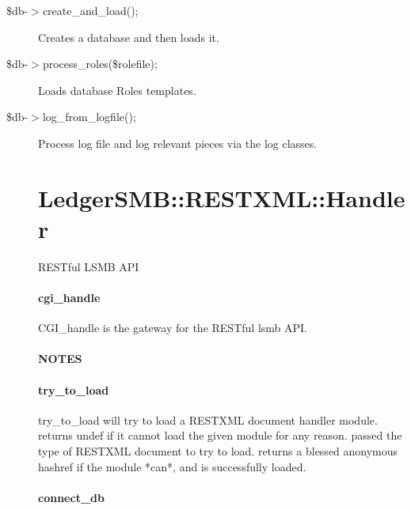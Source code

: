 \begin{description}
\begin{description}
\begin{description}
\begin{description}
\begin{description}
\begin{description}
\begin{description}
\item[{\$db-$>$create\_and\_load();}] \mbox{}

Creates a database and then loads it.


\item[{\$db-$>$process\_roles(\$rolefile);}] \mbox{}

Loads database Roles templates.


\item[{\$db-$>$log\_from\_logfile();}] \mbox{}

Process log file and log relevant pieces via the log classes.

\section{LedgerSMB::RESTXML::Handler\label{LedgerSMB::RESTXML::Handler}}


RESTful LSMB API

\paragraph*{cgi\_handle\label{LedgerSMB::RESTXML::Handler_cgi_handle}}


CGI\_handle is the gateway for the RESTful lsmb API.

\paragraph*{NOTES\label{LedgerSMB::RESTXML::Handler_NOTES}}
\paragraph*{try\_to\_load\label{LedgerSMB::RESTXML::Handler_try_to_load}}


try\_to\_load will try to load a RESTXML document handler module.  returns undef
if it cannot load the given module for any reason.  passed the type of RESTXML
document to try to load.  returns a blessed anonymous hashref if the module
*can*, and is successfully loaded.

\paragraph*{connect\_db\label{LedgerSMB::RESTXML::Handler_connect_db}}



\end{description}
\end{description}
\end{description}
\end{description}
\end{description}
\end{description}
\end{description}
